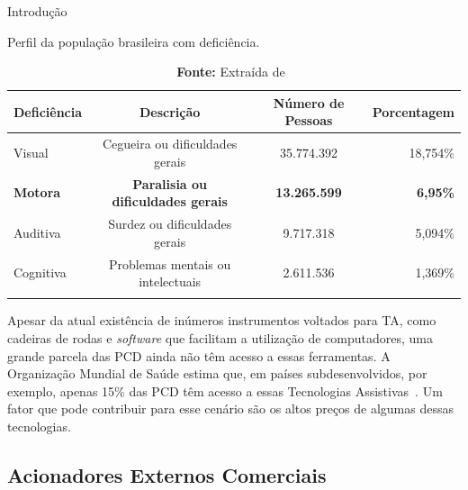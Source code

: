 \begin{chapter}{Introdução}
\begin{table}[!h]
\centering
\caption{Perfil da população brasileira com deficiência.}
\label{tab:ibge}
\def\arraystretch{1}
\begin{tabular}{lccr}
	\hline
	\hline
	\textbf{Deficiência} & \textbf{Descrição} & \textbf{Número de Pessoas} &
\textbf{Porcentagem} \\
	\hline
	Visual    & Cegueira ou dificuldades gerais   & 35.774.392  & 18,754\%  \\
	\textbf{Motora}    & \textbf{Paralisia ou dificuldades gerais}  & \textbf{13.265.599}  & \textbf{6,95\%} \\
	Auditiva  & Surdez ou dificuldades gerais     & 9.717.318   &  5,094\%  \\
	Cognitiva & Problemas mentais ou intelectuais & 2.611.536   &  1,369\%  \\ 
	\hline
	\hline
\vspace{-1.25cm}
\end{tabular}
\caption*{\textbf{Fonte:} Extraída de~\cite{tIBGE}}
\end{table} %

Apesar da atual existência de inúmeros instrumentos voltados para TA, como
cadeiras de rodas e \textit{software} que facilitam a utilização de
computadores, uma grande parcela das PCD ainda não têm acesso a essas
ferramentas. A Organização Mundial de Saúde estima que, em países
subdesenvolvidos, por exemplo, apenas 15\% das PCD têm acesso a essas Tecnologias
Assistivas~\cite{WHO15}. Um fator que pode contribuir para esse cenário são os
altos preços de algumas dessas tecnologias. 

\subsection{Acionadores Externos Comerciais}


\end{chapter}
